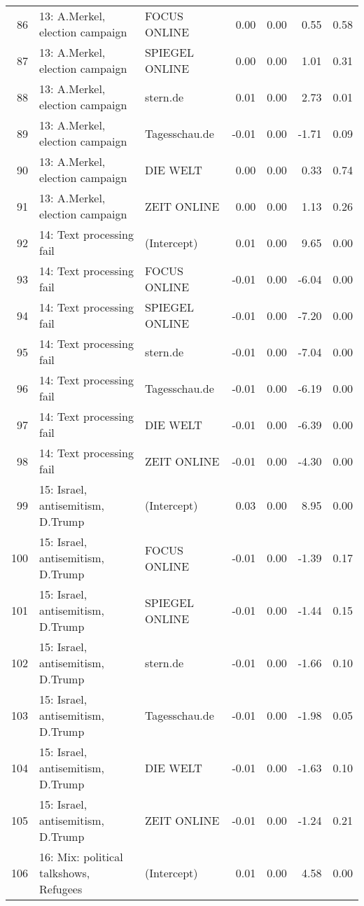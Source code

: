 \begin{table}[ht]
{\begin{tabular}{rllrrrr}
  86 & 13: A.Merkel, election campaign & FOCUS ONLINE & 0.00 & 0.00 & 0.55 & 0.58 \\ 
  87 & 13: A.Merkel, election campaign & SPIEGEL ONLINE & 0.00 & 0.00 & 1.01 & 0.31 \\ 
  88 & 13: A.Merkel, election campaign & stern.de & 0.01 & 0.00 & 2.73 & 0.01 \\ 
  89 & 13: A.Merkel, election campaign & Tagesschau.de & -0.01 & 0.00 & -1.71 & 0.09 \\ 
  90 & 13: A.Merkel, election campaign & DIE WELT & 0.00 & 0.00 & 0.33 & 0.74 \\ 
  91 & 13: A.Merkel, election campaign & ZEIT ONLINE & 0.00 & 0.00 & 1.13 & 0.26 \\ 
  92 & 14: Text processing fail & (Intercept) & 0.01 & 0.00 & 9.65 & 0.00 \\ 
  93 & 14: Text processing fail & FOCUS ONLINE & -0.01 & 0.00 & -6.04 & 0.00 \\ 
  94 & 14: Text processing fail & SPIEGEL ONLINE & -0.01 & 0.00 & -7.20 & 0.00 \\ 
  95 & 14: Text processing fail & stern.de & -0.01 & 0.00 & -7.04 & 0.00 \\ 
  96 & 14: Text processing fail & Tagesschau.de & -0.01 & 0.00 & -6.19 & 0.00 \\ 
  97 & 14: Text processing fail & DIE WELT & -0.01 & 0.00 & -6.39 & 0.00 \\ 
  98 & 14: Text processing fail & ZEIT ONLINE & -0.01 & 0.00 & -4.30 & 0.00 \\ 
  99 & 15: Israel, antisemitism, D.Trump & (Intercept) & 0.03 & 0.00 & 8.95 & 0.00 \\ 
  100 & 15: Israel, antisemitism, D.Trump & FOCUS ONLINE & -0.01 & 0.00 & -1.39 & 0.17 \\ 
  101 & 15: Israel, antisemitism, D.Trump & SPIEGEL ONLINE & -0.01 & 0.00 & -1.44 & 0.15 \\ 
  102 & 15: Israel, antisemitism, D.Trump & stern.de & -0.01 & 0.00 & -1.66 & 0.10 \\ 
  103 & 15: Israel, antisemitism, D.Trump & Tagesschau.de & -0.01 & 0.00 & -1.98 & 0.05 \\ 
  104 & 15: Israel, antisemitism, D.Trump & DIE WELT & -0.01 & 0.00 & -1.63 & 0.10 \\ 
  105 & 15: Israel, antisemitism, D.Trump & ZEIT ONLINE & -0.01 & 0.00 & -1.24 & 0.21 \\ 
  106 & 16: Mix: political talkshows, Refugees & (Intercept) & 0.01 & 0.00 & 4.58 & 0.00 \\ 

\end{tabular}}
\end{table}
